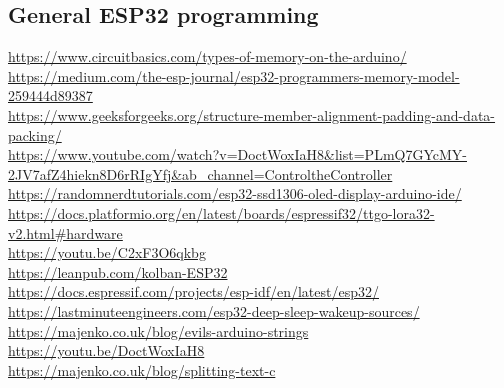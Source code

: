 \documentclass[11pt,a4paper]{article}
\begin{document}
\subsection{General ESP32 programming}


\url{https://www.circuitbasics.com/types-of-memory-on-the-arduino/}\\[4pt]
\url{https://medium.com/the-esp-journal/esp32-programmers-memory-model-259444d89387}\\[4pt]
\url{https://www.geeksforgeeks.org/structure-member-alignment-padding-and-data-packing/}\\[4pt]
\url{https://www.youtube.com/watch?v=DoctWoxIaH8&list=PLmQ7GYcMY-2JV7afZ4hiekn8D6rRIgYfj&ab_channel=ControltheController}\\[4pt]
\url{https://randomnerdtutorials.com/esp32-ssd1306-oled-display-arduino-ide/}\\[4pt]
\url{https://docs.platformio.org/en/latest/boards/espressif32/ttgo-lora32-v2.html#hardware}\\[4pt]
\url{https://youtu.be/C2xF3O6qkbg}\\[4pt]
\url{https://leanpub.com/kolban-ESP32}\\[4pt]
\url{https://docs.espressif.com/projects/esp-idf/en/latest/esp32/}\\[4pt]
\url{https://lastminuteengineers.com/esp32-deep-sleep-wakeup-sources/}\\[4pt]
\url{https://majenko.co.uk/blog/evils-arduino-strings}\\[4pt]
\url{https://youtu.be/DoctWoxIaH8}\\[4pt]
\url{https://majenko.co.uk/blog/splitting-text-c}


\nocite{*}   %
\printbibliography[heading=bibintoc]
\end{document}

